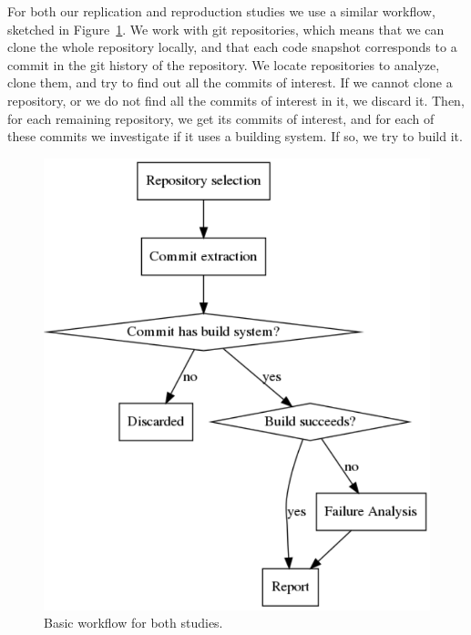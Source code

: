 For both our replication and reproduction studies we use a similar workflow, sketched in Figure~\ref{fig:methodology}. We work with git repositories, which means that we can clone the whole repository locally, and that each code snapshot corresponds to a commit in the git history of the repository. We locate repositories to analyze, clone them, and try to find out all the commits of interest. If we cannot clone a repository, or we do not find all the commits of interest in it, we discard it. Then, for each remaining repository, we get its commits of interest, and for each of these commits we investigate if it uses a building system. If so, we try to build it.

\begin{figure}[ht!]
\centering    
\includegraphics[height=0.8\textwidth]{pages/01-Buildability/images/Methodology.pdf}
\caption{Basic workflow for both studies.}
\label{fig:methodology}
\end{figure}


\renewcommand{\tabcolsep}{3pt}

